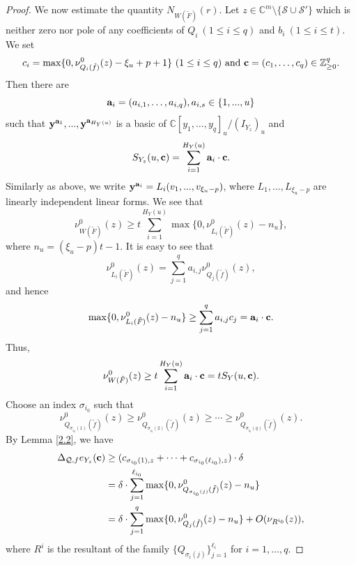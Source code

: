 \documentclass[12pt,leqno]{amsart}
\newcommand{\C}{{\mathbb{C}}}
\numberwithin{equation}{section}
\begin{document}
\begin{proof}
We now estimate the quantity $N_{W(\tilde F)}(r)$. Let $z\in\C^m\setminus\{\mathcal S\cup\mathcal S'\}$ which is neither zero nor pole of any coefficients of $Q_i\ (1\le i\le q)$ and $b_i\ (1\le i\le t)$. We set 
$$c_{i}=\max\{0,\nu^0_{Q_i(\tilde f)}(z)-\xi_u+p+1\}\ (1\le i\le q) \text{ and } {\bf c}=(c_{1},\ldots,c_{q})\in\mathbb Z^q_{\ge 0}.$$
Then there are 
$${\bf a}_i=(a_{i,1},\ldots,a_{i,q}),a_{i,s}\in\{1,...,u\}$$
such that ${\bf y}^{{\bf a}_1},...,{\bf y}^{{\bf a}_{H_Y(u)}}$ is a basic of $\C[y_1,\ldots,y_q]_u/(I_{Y_z})_u$ and
$$ S_{Y_z}(u,{\bf c})=\sum_{i=1}^{H_Y(u)}{\bf a}_i\cdot{\bf c}.$$
Similarly as above, we write ${\bf y}^{{\bf a}_i}=L_i(v_1,...,v_{\xi_u-p})$, where $L_1,...,L_{\xi_u-p}$ are linearly independent linear forms. We see that 
$$ \nu^0_{W(\tilde F)}(z)\ge t\sum_{i=1}^{H_Y(u)}\max\{0,\nu^0_{L_i(\tilde F)}(z)-n_u\},$$
where $n_u=(\xi_u-p)t-1$. It is easy to see that
$$ \nu^0_{L_i(\tilde F)}(z)=\sum_{j=1}^qa_{i,j}\nu^0_{Q_j(\tilde f)}(z),$$
and hence
$$ \max\{0,\nu^0_{L_i(\tilde F)}(z)-n_u\}\ge\sum_{j=1}^qa_{i,j}c_{j}={{\bf a}_i}\cdot{\bf c}. $$
Thus, 
\begin{align}\label{3.8}
\nu^0_{W(\tilde F)}(z)\ge t\sum_{i=1}^{H_Y(u)}{{\bf a}_i}\cdot{\bf c}=tS_Y(u,{\bf c}).
\end{align}
Choose an index $\sigma_{i_0}$ such that 
$$\nu^0_{Q_{\sigma_{i_0}(1)}(\tilde f)}(z)\ge \nu^0_{Q_{\sigma_{i_0}(2)}(\tilde f)}(z)\ge\cdots\ge \nu^0_{Q_{\sigma_{i_0}(q)}(\tilde f)}(z).$$
By Lemma \ref{2.2}, we have
\begin{align*}
\Delta_{\mathcal Q,f}e_{Y_z}({\bf c})&\ge (c_{\sigma_{i_0}(1),z}+\cdots +c_{\sigma_{i_0}(\ell_{i_0}),z})\cdot\delta\\
&=\delta\cdot\sum_{j=1}^{\ell_{i_0}}\max\{0,\nu^0_{Q_{\sigma_{i_0}(j)}(\tilde f)}(z)-n_u\}\\
&=\delta\cdot\sum_{j=1}^{q}\max\{0,\nu^0_{Q_j(\tilde f)}(z)-n_u\}+O(\nu_{R^{i_0}}(z)),
\end{align*}
where $R^{i}$ is the resultant of the family $\{Q_{\sigma_i(j)}\}_{j=1}^{\ell_i}$ for $i=1,\ldots,q$. 


\end{proof}
\end{document}
